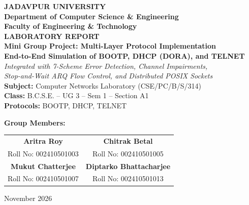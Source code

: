 \documentclass[12pt, a4paper]{article}
\begin{document}
\begin{titlepage}
    \centering
    \vspace*{1.2cm}

    {\huge \textbf{JADAVPUR UNIVERSITY}}\\[0.35cm]
    {\Large \textbf{Department of Computer Science \& Engineering}}\\[0.2cm]
    {\large \textbf{Faculty of Engineering \& Technology}}\\[1.5cm]
    
    {\huge \textbf{LABORATORY REPORT}}\\[0.5cm]
    {\LARGE \textbf{Mini Group Project: Multi-Layer Protocol Implementation}}\\[0.3cm]
    {\large \textbf{End-to-End Simulation of BOOTP, DHCP (DORA), and TELNET}}\\[0.2cm]
    {\normalsize \textit{Integrated with 7-Scheme Error Detection, Channel Impairments,}}\\[0.1cm]
    {\normalsize \textit{Stop-and-Wait ARQ Flow Control, and Distributed POSIX Sockets}}\\[1.2cm]
    
    {\large
    \textbf{Subject:} Computer Networks Laboratory (CSE/PC/B/S/314)\\[0.25cm]
    \textbf{Class:} B.C.S.E. -- UG 3 -- Sem 1 -- Section A1\\[0.25cm]
    \textbf{Protocols:} BOOTP, DHCP, TELNET\\[1.0cm]
    }

    {\Large \textbf{Group Members:}}\\[0.4cm]
    \begin{table}[H]
    \centering
    \large
    \begin{tabular}{c@{\hspace{2.5cm}}c}
        \toprule
        \textbf{Aritra Roy} & \textbf{Chitrak Betal} \\
        \normalsize Roll No: 002410501003 & \normalsize Roll No: 002410501005 \\[0.25cm]
        \textbf{Mukut Chatterjee} & \textbf{Diptarko Bhattacharjee} \\
        \normalsize Roll No: 002410501007 & \normalsize Roll No: 002410501013 \\
        \bottomrule
    \end{tabular}
    \end{table}

    \vfill
    {\large November 2026}
\end{titlepage}
\end{document}

